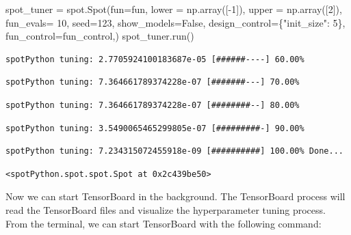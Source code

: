 \documentclass[
  letterpaper,
  DIV=11,
  numbers=noendperiod]{scrreprt}
\newenvironment{Shaded}{\begin{snugshade}}{\end{snugshade}}
\newcommand{\DecValTok}[1]{\textcolor[rgb]{0.68,0.00,0.00}{#1}}
\newcommand{\NormalTok}[1]{\textcolor[rgb]{0.00,0.23,0.31}{#1}}
\newcommand{\OperatorTok}[1]{\textcolor[rgb]{0.37,0.37,0.37}{#1}}
\newcommand{\StringTok}[1]{\textcolor[rgb]{0.13,0.47,0.30}{#1}}
\newcommand{\VariableTok}[1]{\textcolor[rgb]{0.07,0.07,0.07}{#1}}
\begin{document}
\begin{Shaded}
\begin{Highlighting}[]
\NormalTok{spot\_tuner }\OperatorTok{=}\NormalTok{ spot.Spot(fun}\OperatorTok{=}\NormalTok{fun,}
\NormalTok{                   lower }\OperatorTok{=}\NormalTok{ np.array([}\OperatorTok{{-}}\DecValTok{1}\NormalTok{]),}
\NormalTok{                   upper }\OperatorTok{=}\NormalTok{ np.array([}\DecValTok{2}\NormalTok{]),}
\NormalTok{                   fun\_evals}\OperatorTok{=} \DecValTok{10}\NormalTok{,}
\NormalTok{                   seed}\OperatorTok{=}\DecValTok{123}\NormalTok{,}
\NormalTok{                   show\_models}\OperatorTok{=}\VariableTok{False}\NormalTok{,}
\NormalTok{                   design\_control}\OperatorTok{=}\NormalTok{\{}\StringTok{"init\_size"}\NormalTok{: }\DecValTok{5}\NormalTok{\},}
\NormalTok{                   fun\_control}\OperatorTok{=}\NormalTok{fun\_control,)}
\NormalTok{spot\_tuner.run()}
\end{Highlighting}
\end{Shaded}

\begin{verbatim}
spotPython tuning: 2.7705924100183687e-05 [######----] 60.00% 
\end{verbatim}

\begin{verbatim}
spotPython tuning: 7.364661789374228e-07 [#######---] 70.00% 
\end{verbatim}

\begin{verbatim}
spotPython tuning: 7.364661789374228e-07 [########--] 80.00% 
\end{verbatim}

\begin{verbatim}
spotPython tuning: 3.5490065465299805e-07 [#########-] 90.00% 
\end{verbatim}

\begin{verbatim}
spotPython tuning: 7.234315072455918e-09 [##########] 100.00% Done...
\end{verbatim}

\begin{verbatim}
<spotPython.spot.spot.Spot at 0x2c439be50>
\end{verbatim}

Now we can start TensorBoard in the background. The TensorBoard process
will read the TensorBoard files and visualize the hyperparameter tuning
process. From the terminal, we can start TensorBoard with the following
command:
\end{document}
